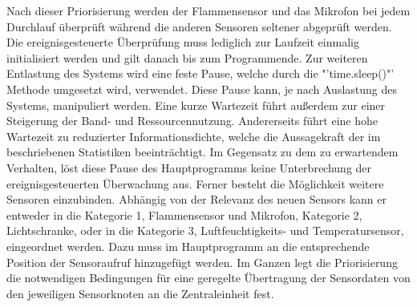 Nach dieser Priorisierung werden der Flammensensor und das Mikrofon bei jedem Durchlauf überprüft während die anderen Sensoren seltener abgeprüft werden. Die ereignisgesteuerte Überprüfung muss lediglich zur Laufzeit einmalig initialisiert werden und gilt danach bis zum Programmende. Zur weiteren Entlastung des Systems wird eine feste Pause, welche durch die "'time.sleep()"' Methode umgesetzt wird, verwendet. Diese Pause kann, je nach Auslastung des Systems, manipuliert werden. Eine kurze Wartezeit führt außerdem zur einer Steigerung der Band- und Ressourcennutzung. Andererseits führt eine hohe Wartezeit zu reduzierter Informationsdichte, welche die Aussagekraft der im  beschriebenen Statistiken beeinträchtigt. Im Gegensatz zu dem zu erwartendem Verhalten, löst diese Pause des Hauptprogramms keine Unterbrechung der ereignisgesteuerten Überwachung aus. Ferner besteht die Möglichkeit weitere Sensoren einzubinden. Abhängig von der Relevanz des neuen Sensors kann er entweder in die Kategorie 1, Flammensensor und Mikrofon, Kategorie 2, Lichtschranke, oder in die Kategorie 3, Luftfeuchtigkeits- und Temperatursensor, eingeordnet werden. Dazu muss im Hauptprogramm an die entsprechende Position der Sensoraufruf hinzugefügt werden. Im Ganzen legt die Priorisierung die notwendigen Bedingungen für eine geregelte Übertragung der Sensordaten von den jeweiligen Sensorknoten an die Zentraleinheit fest.

